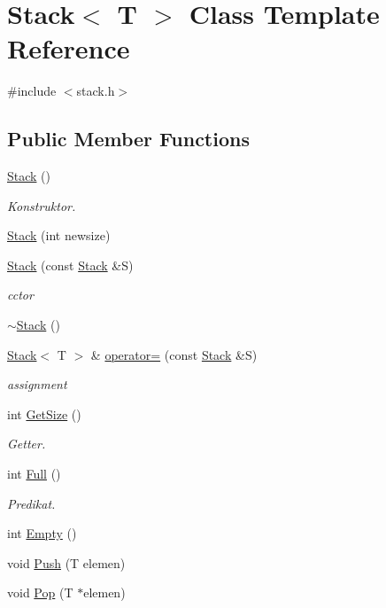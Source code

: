 \hypertarget{class_stack}{\section{Stack$<$ T $>$ Class Template Reference}
\label{class_stack}
}


{\ttfamily \#include $<$stack.\-h$>$}

\subsection*{Public Member Functions}
\begin{DoxyCompactItemize}
\item 
\hyperlink{class_stack_aefee698059467258bbd79045aca62a63}{Stack} ()
\begin{DoxyCompactList}\small\item\em Konstruktor. \end{DoxyCompactList}\item 
\hyperlink{class_stack_a8b366aa6e858c1446754e8e39e47bb29}{Stack} (int newsize)
\item 
\hyperlink{class_stack_ac48db567b5a0cbc1b233424584dffaf7}{Stack} (const \hyperlink{class_stack}{Stack} \&S)
\begin{DoxyCompactList}\small\item\em cctor \end{DoxyCompactList}\item 
\hyperlink{class_stack_a9e7a00875aefbdac560ab189b7bc61d1}{$\sim$\-Stack} ()
\item 
\hyperlink{class_stack}{Stack}$<$ T $>$ \& \hyperlink{class_stack_ac9fcee8f3d3c2f444333eb285ced2ad3}{operator=} (const \hyperlink{class_stack}{Stack} \&S)
\begin{DoxyCompactList}\small\item\em assignment \end{DoxyCompactList}\item 
int \hyperlink{class_stack_a536d81ee9a732ad18ab76b84ad5237b2}{Get\-Size} ()
\begin{DoxyCompactList}\small\item\em Getter. \end{DoxyCompactList}\item 
int \hyperlink{class_stack_ad04516610308db3c177b6383d534365f}{Full} ()
\begin{DoxyCompactList}\small\item\em Predikat. \end{DoxyCompactList}\item 
int \hyperlink{class_stack_a30a2b48400dd12a3377dffdaf80024e9}{Empty} ()
\item 
void \hyperlink{class_stack_aacaf0b0e50663caf01f0f6763faa3e10}{Push} (T elemen)
\item 
void \hyperlink{class_stack_ac6535f044f43b47aed7141e2ce502477}{Pop} (T $\ast$elemen)
\end{DoxyCompactItemize}


